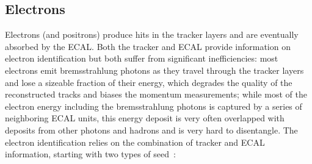 \subsection{Electrons}\label{sec:reco_ele}

Electrons (and positrons) produce hits in the tracker layers and are eventually absorbed by the ECAL.
Both the tracker and ECAL provide information on electron identification but both suffer from significant inefficiencies:
most electrons emit bremsstrahlung photons as they travel through the tracker layers and lose a sizeable fraction of their energy,
which degrades the quality of the reconstructed tracks and biases the momentum measurements;
while most of the electron energy including the bremsstrahlung photons is captured by a series of neighboring ECAL units,
this energy deposit is very often overlapped with deposits from other photons and hadrons and is very hard to disentangle.
The electron identification relies on the combination of tracker and ECAL information, starting with two types of seed~\cite{cmscollaboration2020electron}:
